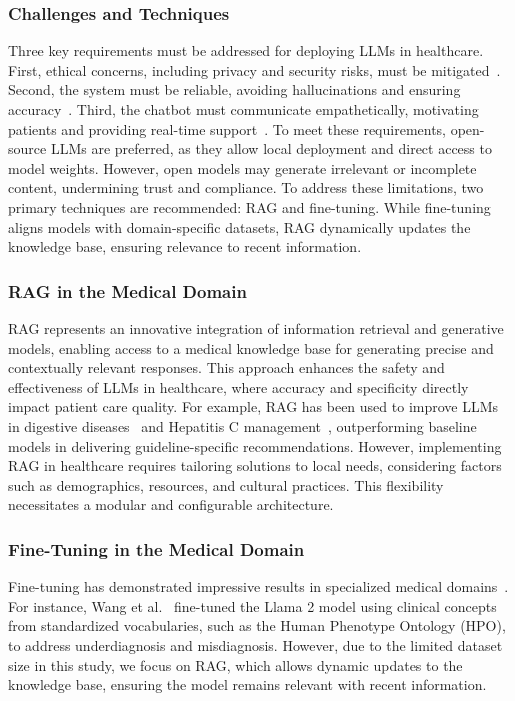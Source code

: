 %
\subsubsection{Challenges and Techniques}
%
Three key requirements must be addressed for deploying \glspl{LLM} in healthcare.
%
First, ethical concerns, including privacy and security risks, must be mitigated~\cite{PLACEHOLDER6}.
%
Second, the system must be reliable, avoiding hallucinations and ensuring accuracy~\cite{PLACEHOLDER7}.
%
Third, the chatbot must communicate empathetically, motivating patients and providing real-time support~\cite{PLACEHOLDER3}.
%
To meet these requirements, open-source \glspl{LLM} are preferred, as they allow local deployment and direct access to model weights.
%
However, open models may generate irrelevant or incomplete content, undermining trust and compliance.
%
To address these limitations, two primary techniques are recommended: \gls{RAG} and fine-tuning.
%
While fine-tuning aligns models with domain-specific datasets, \gls{RAG} dynamically updates the knowledge base, ensuring relevance to recent information.

%
\subsubsection{\Gls{RAG} in the Medical Domain}
%
\Gls{RAG} represents an innovative integration of information retrieval and generative models, enabling access to a medical knowledge base for generating precise and contextually relevant responses.
%
This approach enhances the safety and effectiveness of \glspl{LLM} in healthcare, where accuracy and specificity directly impact patient care quality.
%
For example, \gls{RAG} has been used to improve \glspl{LLM} in digestive diseases~\cite{PLACEHOLDER8} and Hepatitis C management~\cite{PLACEHOLDER9}, outperforming baseline models in delivering guideline-specific recommendations.
%
However, implementing \gls{RAG} in healthcare requires tailoring solutions to local needs, considering factors such as demographics, resources, and cultural practices.
%
This flexibility necessitates a modular and configurable architecture.

%
\subsubsection{Fine-Tuning in the Medical Domain}
%
Fine-tuning has demonstrated impressive results in specialized medical domains~\cite{PLACEHOLDER10}.
%
For instance, Wang et al.~\cite{PLACEHOLDER11} fine-tuned the Llama 2 model using clinical concepts from standardized vocabularies, such as the Human Phenotype Ontology (HPO), to address underdiagnosis and misdiagnosis.
%
However, due to the limited dataset size in this study, we focus on \gls{RAG}, which allows dynamic updates to the knowledge base, ensuring the model remains relevant with recent information.


